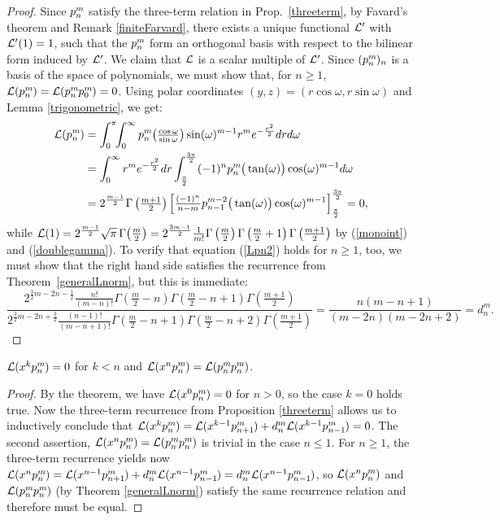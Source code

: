 \begin{proof}
Since $p_{n}^{m}\;\!\!$ satisfy the three-term relation in Prop.~\ref{threeterm}, by Favard's theorem and Remark \ref{finiteFarvard}, there exists a unique functional $\mathcal{L}'$ with $\mathcal{L}'(1)=1$, such that the $p_{n}^{m}\;\!\!$ form an orthogonal basis with respect to the bilinear form induced by $\mathcal{L}'$. We claim that $\mathcal{L}$ is a scalar multiple of $\mathcal{L}'$.
Since $(p_{n}^{m}\;\!\!)_{n} $ is a basis of the space of polynomials, we must show that, for $n\geq 1$, $\mathcal{L}(p_{n}^{m}\;\!\!) = \mathcal{L}(p_{n}^{m}\;\!\!p_{0}^{m}\;\!\!) =0$.
Using polar coordinates $(y,z) = (r\cos\omega,r\sin\omega)$ and Lemma \ref{trigonometric}, we get:
\begin{align*}
\L(\pol{n}{m}) &= \int_0^\pi\!\!\int_0^\infty\pol{n}{m}\!\left(\tfrac{\cos\omega}{\sin\omega}\right)\sin(\omega)^{m-1} r^m e^{-\frac{r^2}{2}}dr d\omega \\
&=\int_0^\infty r^m e^{-\frac{r^2}{2}}dr \int_{\frac{\pi}{2}}^{\frac{3\pi}{2}} (-1)^n \pol{n}{m}\big(\tan(\omega)\big)\cos(\omega)^{m-1}d\omega\\
&= 2^{\frac{m-1}{2}}\Gamma\left(\tfrac{m+1}{2}\right)\Big[\tfrac{(-1)^n}{n-m}p_{n-1}^{m-2}\big(\tan(\omega)\big)\cos(\omega)^{m-1} \Big]_{\frac{\pi}{2}}^{\frac{3\pi}{2}} =0,
\end{align*}
while $\mathcal{L}(1) = 2^{\frac{m-1}{2}}\sqrt{\pi}\,\Gamma\!\left(\frac{m}{2}\right)=2^{\frac{3m-1}{2}}  \frac{1}{m!}
\Gamma\left(\frac{m}{2}\right)\Gamma\left(\frac{m}{2}+1\right)\Gamma\left(\frac{m+1}{2}\right)$ by (\ref{monoint}) and (\ref{doublegamma}). To verify that equation (\ref{Lpn2}) holds for $n\geq 1$, too, we must show that the right hand side satisfies the recurrence from Theorem~\ref{generalLnorm}, but this is immediate:
$$ 
\frac{2^{\frac{3}{2}m\!-\!2n\!-\!\frac{1}{2}}  \frac{n!}{(m\!-\!n)!}
\Gamma\!\left(\frac{m}{2}\!-\!n\right)\Gamma\!\left(\frac{m}{2}\!-\!n\!+\!1\right)\Gamma\!\left(\frac{m+1}{2}\right)}{
2^{\frac{3}{2}m\!-\!2n\!+\!\frac{3}{2}}  \frac{(n\!-\!1)!}{(m\!-\!n\!+\!1)!}
\Gamma\!\left(\frac{m}{2}\!-\!n\!+\!1\right)\Gamma\!\left(\frac{m}{2}\!-\!n\!+\!2\right)\Gamma\!\left(\frac{m+1}{2}\right)} = \frac{n(m\!-\!n\!+\!1)}{(m\!-\!2n)(m\!-\!2n\!+\!2)} =d_n^m.
$$
\end{proof}
\begin{corollary} \label{pcor}
 $\mathcal{L}(x^{k}p_{n}^{m}\;\!\!) = 0$ for $k < n$ and $\mathcal{L}(x^np_{n}^{m}\;\!\!)= \mathcal{L}(p_{n}^{m}\;\!\!p_{n}^{m}\;\!\!)$.
\end{corollary}
\begin{proof} By the theorem, we have $\mathcal{L}(x^{0}p_{n}^{m}\;\!\!) = 0$ for $n>0$, so the case $k=0$ holds true.
Now the three-term recurrence from Proposition \ref{threeterm} allows us to inductively conclude that $\mathcal{L}(x^kp_{n}^{m}\;\!\!) = \mathcal{L}(x^{k-1}p_{n+1}^{m}\;\!\!)+d_n^m\mathcal{L}(x^{k-1}p_{n-1}^{m}\;\!\!) =0$.
The second assertion, $\mathcal{L}(x^np_{n}^{m}\;\!\!)= \mathcal{L}(p_{n}^{m}\;\!\!p_{n}^{m}\;\!\!)$ is trivial in the case $n\leq 1$. For $n\geq 1$, the three-term recurrence yields now $\L(x^n\pol{n}{m}) = \L(x^{n-1}\pol{n+1}{m})+d_n^m\L(x^{n-1}\pol{n-1}{m})=d_n^m\L(x^{n-1}\pol{n-1}{m})$, so $\mathcal{L}(x^np_{n}^{m}\;\!\!)$ and $\mathcal{L}(p_{n}^{m}\;\!\!p_{n}^{m}\;\!\!)$ (by Theorem \ref{generalLnorm}) satisfy the same recurrence relation and therefore must be equal.
\end{proof}



